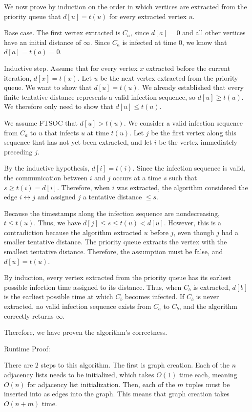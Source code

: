 \documentclass[11pt]{article}
\begin{document}
We now prove by induction on the order in which vertices are extracted from the priority queue that $d[u] = t(u)$ for every extracted vertex $u$.

Base case. The first vertex extracted is $C_a$, since $d[a] = 0$ and all other vertices have an initial distance of $\infty$. 
Since $C_a$ is infected at time 0, we know that $d[a] = t(a) = 0$.

Inductive step. Assume that for every vertex $x$ extracted before the current iteration, $d[x] = t(x)$. 
Let $u$ be the next vertex extracted from the priority queue. We want to show that $d[u] = t(u)$. 
We already established that every finite tentative distance represents a valid infection sequence, so $d[u] \geq t(u)$. 
We therefore only need to show that $d[u] \leq t(u)$. 

We assume FTSOC that $d[u] > t(u)$. We consider a valid infection sequence from $C_a$ to $u$ that infects $u$ at time $t(u)$. 
Let $j$ be the first vertex along this sequence that has not yet been extracted, and let $i$ be the vertex immediately preceding $j$.

By the inductive hypothesis, $d[i] = t(i)$. Since the infection sequence is valid, the communication between $i$ and $j$ occurs at a time $s$ 
such that $s \geq t(i) = d[i]$. Therefore, when $i$ was extracted, the algorithm considered the edge $i \leftrightarrow j$ 
and assigned $j$ a tentative distance $\leq s$.

Because the timestamps along the infection sequence are nondecreasing, $t \leq t(u)$. Thus, we have $d[j] \leq s \leq t(u) < d[u]$.
However, this is a contradiction because the algorithm extracted $u$ before $j$, even though $j$ had a smaller tentative distance. 
The priority queue  extracts the vertex with the smallest tentative distance. Therefore, the assumption must be false, and $d[u] = t(u)$.

By induction, every vertex extracted from the priority queue has its earliest possible infection time assigned to its distance. 
Thus, when $C_b$ is extracted, $d[b]$ is the earliest possible time at which $C_b$ becomes infected. 
If $C_b$ is never extracted, no valid infection sequence exists from $C_a$ to $C_b$, and the algorithm correctly returns $\infty$.

Therefore, we have proven the algorithm's correctness.

\bigbreak

Runtime Proof:

There are $2$ steps to this algorithm. The first is graph creation. Each of the $n$ adjacency lists needs to be initialized, 
which takes $O(1)$ time each, meaning $O(n)$ for adjacency list initialization. Then, each of the $m$ tuples must be inserted into as edges 
into the graph. This means that graph creation takes $O(n + m)$ time. 
\end{document}

